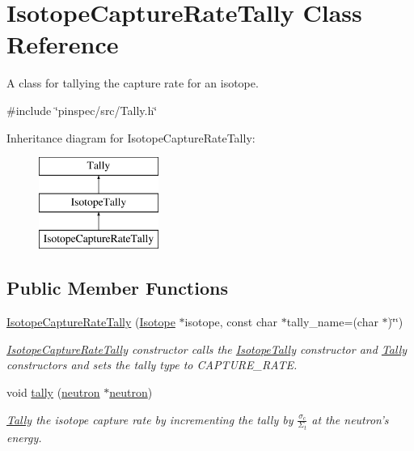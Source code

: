 \hypertarget{classIsotopeCaptureRateTally}{\section{Isotope\-Capture\-Rate\-Tally Class Reference}
\label{classIsotopeCaptureRateTally}
}


A class for tallying the capture rate for an isotope.  




{\ttfamily \#include \char`\"{}pinspec/src/\-Tally.\-h\char`\"{}}

Inheritance diagram for Isotope\-Capture\-Rate\-Tally\-:\begin{figure}[H]
\begin{center}
\leavevmode
\includegraphics[height=3.000000cm]{classIsotopeCaptureRateTally}
\end{center}
\end{figure}
\subsection*{Public Member Functions}
\begin{DoxyCompactItemize}
\item 
\hyperlink{classIsotopeCaptureRateTally_a2c70af2bf2ba93167f96d1949ded2170}{Isotope\-Capture\-Rate\-Tally} (\hyperlink{classIsotope}{Isotope} $\ast$isotope, const char $\ast$tally\-\_\-name=(char $\ast$)\char`\"{}\char`\"{})
\begin{DoxyCompactList}\small\item\em \hyperlink{classIsotopeCaptureRateTally}{Isotope\-Capture\-Rate\-Tally} constructor calls the \hyperlink{classIsotopeTally}{Isotope\-Tally} constructor and \hyperlink{classTally}{Tally} constructors and sets the tally type to C\-A\-P\-T\-U\-R\-E\-\_\-\-R\-A\-T\-E. \end{DoxyCompactList}\item 
void \hyperlink{classIsotopeCaptureRateTally_a6fb691f21aefd869d86622f6304c05e3}{tally} (\hyperlink{structneutron}{neutron} $\ast$\hyperlink{structneutron}{neutron})
\begin{DoxyCompactList}\small\item\em \hyperlink{classTally}{Tally} the isotope capture rate by incrementing the tally by $ \frac{\sigma_c}{\Sigma_t} $ at the neutron's energy. \end{DoxyCompactList}\end{DoxyCompactItemize}
